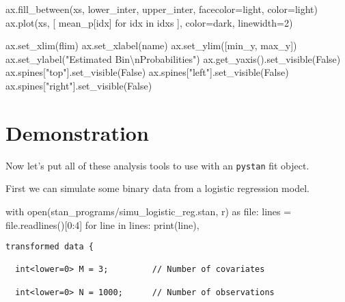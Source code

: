 \documentclass[
  letterpaper,
  DIV=11,
  numbers=noendperiod]{scrartcl}
\newenvironment{Shaded}{\begin{snugshade}}{\end{snugshade}}
\newcommand{\BuiltInTok}[1]{\textcolor[rgb]{0.00,0.23,0.31}{#1}}
\newcommand{\CharTok}[1]{\textcolor[rgb]{0.13,0.47,0.30}{#1}}
\newcommand{\ControlFlowTok}[1]{\textcolor[rgb]{0.00,0.23,0.31}{#1}}
\newcommand{\DecValTok}[1]{\textcolor[rgb]{0.68,0.00,0.00}{#1}}
\newcommand{\ImportTok}[1]{\textcolor[rgb]{0.00,0.46,0.62}{#1}}
\newcommand{\KeywordTok}[1]{\textcolor[rgb]{0.00,0.23,0.31}{#1}}
\newcommand{\NormalTok}[1]{\textcolor[rgb]{0.00,0.23,0.31}{#1}}
\newcommand{\OperatorTok}[1]{\textcolor[rgb]{0.37,0.37,0.37}{#1}}
\newcommand{\StringTok}[1]{\textcolor[rgb]{0.13,0.47,0.30}{#1}}
\newcommand{\VariableTok}[1]{\textcolor[rgb]{0.07,0.07,0.07}{#1}}
\begin{document}
\begin{Shaded}
\begin{Highlighting}[]
\NormalTok{  ax.fill\_between(xs, lower\_inter, upper\_inter,}
\NormalTok{                    facecolor}\OperatorTok{=}\NormalTok{light, color}\OperatorTok{=}\NormalTok{light)}
\NormalTok{  ax.plot(xs, [ mean\_p[idx] }\ControlFlowTok{for}\NormalTok{ idx }\KeywordTok{in}\NormalTok{ idxs ], color}\OperatorTok{=}\NormalTok{dark, linewidth}\OperatorTok{=}\DecValTok{2}\NormalTok{)}
  
\NormalTok{  ax.set\_xlim(flim)}
\NormalTok{  ax.set\_xlabel(name)}
\NormalTok{  ax.set\_ylim([min\_y, max\_y])}
\NormalTok{  ax.set\_ylabel(}\StringTok{"Estimated Bin}\CharTok{\textbackslash{}n}\StringTok{Probabilities"}\NormalTok{)}
\NormalTok{  ax.get\_yaxis().set\_visible(}\VariableTok{False}\NormalTok{)}
\NormalTok{  ax.spines[}\StringTok{"top"}\NormalTok{].set\_visible(}\VariableTok{False}\NormalTok{)}
\NormalTok{  ax.spines[}\StringTok{"left"}\NormalTok{].set\_visible(}\VariableTok{False}\NormalTok{)}
\NormalTok{  ax.spines[}\StringTok{"right"}\NormalTok{].set\_visible(}\VariableTok{False}\NormalTok{)}
\end{Highlighting}
\end{Shaded}

\hypertarget{demonstration}{%
\section{Demonstration}\label{demonstration}}

Now let's put all of these analysis tools to use with an \texttt{pystan}
fit object.

First we can simulate some binary data from a logistic regression model.

\begin{Shaded}
\begin{Highlighting}[]
\ControlFlowTok{with} \BuiltInTok{open}\NormalTok{(}\StringTok{\textquotesingle{}stan\_programs/simu\_logistic\_reg.stan\textquotesingle{}}\NormalTok{, }\StringTok{\textquotesingle{}r\textquotesingle{}}\NormalTok{) }\ImportTok{as} \BuiltInTok{file}\NormalTok{:}
\NormalTok{  lines }\OperatorTok{=} \BuiltInTok{file}\NormalTok{.readlines()[}\DecValTok{0}\NormalTok{:}\DecValTok{4}\NormalTok{]}
  \ControlFlowTok{for}\NormalTok{ line }\KeywordTok{in}\NormalTok{ lines:}
    \BuiltInTok{print}\NormalTok{(line),}
\end{Highlighting}
\end{Shaded}

\begin{verbatim}
transformed data {

  int<lower=0> M = 3;         // Number of covariates

  int<lower=0> N = 1000;      // Number of observations

  
\end{verbatim}
\end{document}
